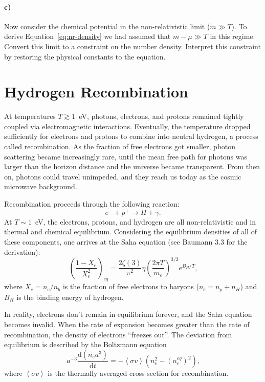 \documentclass[12pt]{article}
\newcommand\diff{\mathrm{d}}
\begin{document}
\paragraph{c)} Now consider the chemical potential in the non-relativistic limit
($m \gg T$). To derive Equation~\ref{eq:nr-density} we had assumed that $m - \mu
\gg T$ in this regime. Convert this limit to a constraint on the number density.
Interpret this constraint by restoring the physical constants to the equation.


\section{Hydrogen Recombination}

At temperatures $T \gtrsim 1$~eV, photons, electrons, and protons remained
tightly coupled via electromagnetic interactions. Eventually, the temperature
dropped sufficiently for electrons and protons to combine into neutral hydrogen,
a process called recombination. As the fraction of free electrons got smaller,
photon scattering became increasingly rare, until the mean free path for photons
was larger than the horizon distance and the universe became transparent. From
then on, photons could travel unimpeded, and they reach us today as the cosmic
microwave background.

Recombination proceeds through the following reaction:
\begin{equation}
    e^- + p^+ \rightarrow H + \gamma \text{.}
\end{equation}
At $T \sim 1$~eV, the electrons, protons, and hydrogen are all non-relativistic
and in thermal and chemical equilibrium. Considering the equilibrium densities
of all of these components, one arrives at the Saha equation (see Baumann 3.3
for the derivation):
\begin{equation}
    \left(\frac{1 - X_e}{X_e^2}\right)_{eq} = \frac{2 \zeta(3)}{\pi^2}
    \eta \left(\frac{2 \pi T}{m_e}\right)^{3/2} e^{B_H/T} \text{,}
\end{equation}
where $X_e = n_e / n_b$ is the fraction of free electrons to baryons ($n_b = n_p
+ n_H$) and $B_H$ is the binding energy of hydrogen.

In reality, electrons don't remain in equilibrium forever, and the Saha equation
becomes invalid. When the rate of expansion becomes greater than the rate of
recombination, the density of electrons ``freezes out''. The deviation from
equilibrium is described by the Boltzmann equation
\begin{equation}
    a^{-3} \frac{\diff (n_e a^3)}{\diff t} = - \left<\sigma v\right>
    \left(n_e^2 - (n_e^{eq})^2\right) \text{,}
\end{equation}
where $\left<\sigma v\right>$ is the thermally averaged cross-section for
recombination.
\end{document}
